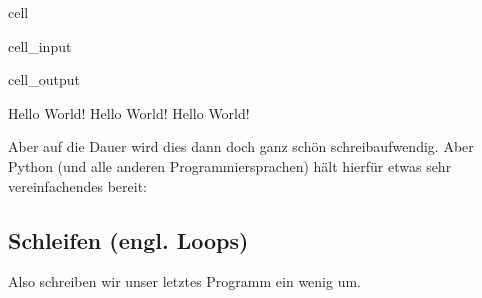 \documentclass[letterpaper,10pt,english]{jupyterBook}
\begin{document}
\begin{sphinxuseclass}{cell}\begin{sphinxVerbatimInput}

\begin{sphinxuseclass}{cell_input}
\begin{sphinxVerbatim}[commandchars=\\\{\}]
 

\end{sphinxVerbatim}

\end{sphinxuseclass}\end{sphinxVerbatimInput}
\begin{sphinxVerbatimOutput}

\begin{sphinxuseclass}{cell_output}
\begin{sphinxVerbatim}[commandchars=\\\{\}]
Hello World!
Hello World!
Hello World!
\end{sphinxVerbatim}

\end{sphinxuseclass}\end{sphinxVerbatimOutput}

\end{sphinxuseclass}
\sphinxAtStartPar
Aber auf die Dauer wird dies dann doch ganz schön schreibaufwendig. Aber Python (und alle anderen Programmiersprachen) hält hierfür etwas sehr vereinfachendes bereit: 


\subsection{Schleifen (engl. Loops)}
\label{\detokenize{Notebooks/HelloWorld:schleifen-engl-loops}}
\sphinxAtStartPar
Also schreiben wir unser letztes Programm ein wenig um.
\end{document}
